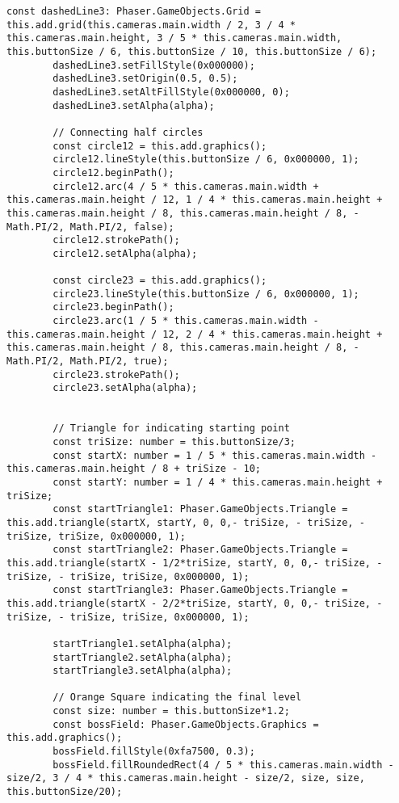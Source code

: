 \begin{lstlisting}[style=TypeScript, caption={levelMenuScene.ts}]
        const dashedLine3: Phaser.GameObjects.Grid = this.add.grid(this.cameras.main.width / 2, 3 / 4 * this.cameras.main.height, 3 / 5 * this.cameras.main.width, this.buttonSize / 6, this.buttonSize / 10, this.buttonSize / 6);
        dashedLine3.setFillStyle(0x000000);
        dashedLine3.setOrigin(0.5, 0.5);
        dashedLine3.setAltFillStyle(0x000000, 0);
        dashedLine3.setAlpha(alpha);

        // Connecting half circles
        const circle12 = this.add.graphics();
        circle12.lineStyle(this.buttonSize / 6, 0x000000, 1);
        circle12.beginPath();
        circle12.arc(4 / 5 * this.cameras.main.width + this.cameras.main.height / 12, 1 / 4 * this.cameras.main.height + this.cameras.main.height / 8, this.cameras.main.height / 8, - Math.PI/2, Math.PI/2, false);
        circle12.strokePath();
        circle12.setAlpha(alpha);

        const circle23 = this.add.graphics();
        circle23.lineStyle(this.buttonSize / 6, 0x000000, 1);
        circle23.beginPath();
        circle23.arc(1 / 5 * this.cameras.main.width - this.cameras.main.height / 12, 2 / 4 * this.cameras.main.height + this.cameras.main.height / 8, this.cameras.main.height / 8, - Math.PI/2, Math.PI/2, true);
        circle23.strokePath();
        circle23.setAlpha(alpha);


        // Triangle for indicating starting point
        const triSize: number = this.buttonSize/3;
        const startX: number = 1 / 5 * this.cameras.main.width - this.cameras.main.height / 8 + triSize - 10;
        const startY: number = 1 / 4 * this.cameras.main.height + triSize;
        const startTriangle1: Phaser.GameObjects.Triangle = this.add.triangle(startX, startY, 0, 0,- triSize, - triSize, - triSize, triSize, 0x000000, 1);
        const startTriangle2: Phaser.GameObjects.Triangle = this.add.triangle(startX - 1/2*triSize, startY, 0, 0,- triSize, - triSize, - triSize, triSize, 0x000000, 1);
        const startTriangle3: Phaser.GameObjects.Triangle = this.add.triangle(startX - 2/2*triSize, startY, 0, 0,- triSize, - triSize, - triSize, triSize, 0x000000, 1);

        startTriangle1.setAlpha(alpha);
        startTriangle2.setAlpha(alpha);
        startTriangle3.setAlpha(alpha);

        // Orange Square indicating the final level
        const size: number = this.buttonSize*1.2;
        const bossField: Phaser.GameObjects.Graphics = this.add.graphics();
        bossField.fillStyle(0xfa7500, 0.3);
        bossField.fillRoundedRect(4 / 5 * this.cameras.main.width - size/2, 3 / 4 * this.cameras.main.height - size/2, size, size, this.buttonSize/20);


\end{lstlisting}
